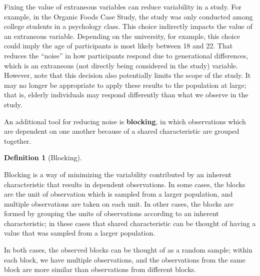 \documentclass[
  letterpaper,
  DIV=11,
  numbers=noendperiod]{scrreprt}
\theoremstyle{definition}
\newtheorem{definition}{Definition}[chapter]
\theoremstyle{definition}
\theoremstyle{plain}
\theoremstyle{remark}
\begin{document}
Fixing the value of extraneous variables can reduce variability in a
study. For example, in the Organic Foods Case Study, the study was only
conducted among college students in a psychology class. This choice
indirectly impacts the value of an extraneous variable. Depending on the
university, for example, this choice could imply the age of participants
is most likely between 18 and 22. That reduces the ``noise'' in how
participants respond due to generational differences, which is an
extraneous (not directly being considered in the study) variable.
However, note that this decision also potentially limits the scope of
the study. It may no longer be appropriate to apply these results to the
population at large; that is, elderly individuals may respond
differently than what we observe in the study.

An additional tool for reducing noise is \textbf{blocking}, in which
observations which are dependent on one another because of a shared
characteristic are grouped together.

\begin{definition}[Blocking]\protect\hypertarget{def-blocking}{}\label{def-blocking}

Blocking is a way of minimizing the variability contributed by an
inherent characteristic that results in dependent observations. In some
cases, the blocks are the unit of observation which is sampled from a
larger population, and multiple observations are taken on each unit. In
other cases, the blocks are formed by grouping the units of observations
according to an inherent characteristic; in these cases that shared
characteristic can be thought of having a value that was sampled from a
larger population.

In both cases, the observed blocks can be thought of as a random sample;
within each block, we have multiple observations, and the observations
from the same block are more similar than observations from different
blocks.

\end{definition}
\end{document}

